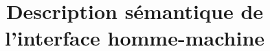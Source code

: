 

\title{Description sémantique de l'interface homme-machine}


    \maketitle
    \tableofcontents
    

